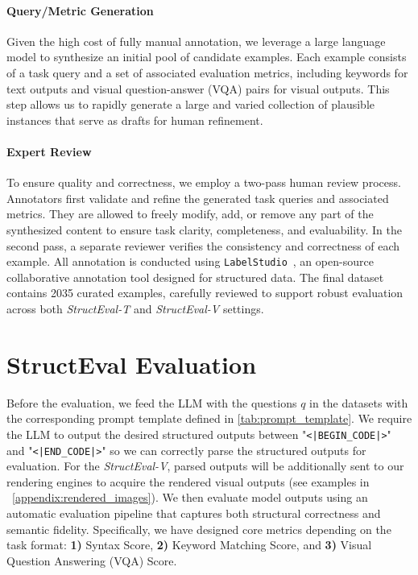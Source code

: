 \paragraph{Query/Metric Generation}  
Given the high cost of fully manual annotation, we leverage a large language model to synthesize an initial pool of candidate examples. Each example consists of a task query and a set of associated evaluation metrics, including keywords for text outputs and visual question-answer (VQA) pairs for visual outputs. This step allows us to rapidly generate a large and varied collection of plausible instances that serve as drafts for human refinement.

\paragraph{Expert Review}  
To ensure quality and correctness, we employ a two-pass human review process. Annotators first validate and refine the generated task queries and associated metrics. They are allowed to freely modify, add, or remove any part of the synthesized content to ensure task clarity, completeness, and evaluability. In the second pass, a separate reviewer verifies the consistency and correctness of each example. All annotation is conducted using \texttt{LabelStudio}~\citep{labelstudio}, an open-source collaborative annotation tool designed for structured data. The final dataset contains 2035 curated examples, carefully reviewed to support robust evaluation across both \emph{StructEval-T} and \emph{StructEval-V} settings.



\section{StructEval Evaluation}
\label{sec:eval_metrics}

Before the evaluation, we feed the LLM with the questions $q$ in the datasets with the corresponding prompt template defined in \autoref{tab:prompt_template}. We require the LLM to output the desired structured outputs between "\texttt{<|BEGIN\_CODE|>}" and "\texttt{<|END\_CODE|>}" so we can correctly parse the structured outputs for evaluation. For the \emph{StructEval-V}, parsed outputs will be additionally sent to our rendering engines to acquire the rendered visual outputs (see examples in ~\autoref{appendix:rendered_images}). 
We then evaluate model outputs using an automatic evaluation pipeline that captures both structural correctness and semantic fidelity. 
Specifically, we have designed core metrics depending on the task format: \textbf{1)} Syntax Score, \textbf{2)} Keyword Matching Score, and \textbf{3)} Visual Question Answering (VQA) Score.


